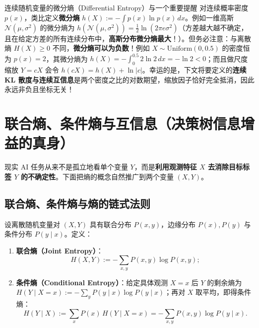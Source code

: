 \begin{extBox}{连续随机变量的微分熵（Differential Entropy）与一个重要提醒}
对连续概率密度 $p(x)$，类比定义\textbf{微分熵} $h(X) := -\int p(x)\ln p(x)\,dx$。例如一维高斯 $\mathcal{N}(\mu, \sigma^2)$ 的微分熵为 $h(\mathcal{N}(\mu,\sigma^2)) = \frac{1}{2}\ln(2\pi e \sigma^2)$（方差越大越不确定，且在给定方差的所有连续分布中，\textbf{高斯分布微分熵最大}！）。但务必注意：与离散熵 $H(X) \ge 0$ 不同，\textbf{微分熵可以为负数}！例如 $X \sim \mathrm{Uniform}(0, 0.5)$ 的密度恒为 $p(x)=2$，其微分熵为 $h(X) = -\int_0^{0.5} 2\ln 2\,dx = -\ln 2 < 0$；而且做尺度缩放 $Y = cX$ 会令 $h(cX) = h(X) + \ln|c|$。幸运的是，下文将要定义的\textbf{连续 KL 散度与连续互信息}是两个密度之比的对数期望，缩放因子恰好完全抵消，因此永远非负且坐标无关！
\end{extBox}

\section{联合熵、条件熵与互信息（决策树信息增益的真身）}
\label{sec:ch4-mi}

现实 AI 任务从来不是孤立地看单个变量 $Y$，而是\textbf{利用观测特征 $X$ 去消除目标标签 $Y$ 的不确定性}。下面把熵的概念自然推广到两个变量 $(X, Y)$。

\subsection{联合熵、条件熵与熵的链式法则}

\begin{defBox}
\begin{definition}[联合熵与条件熵]
\label{def:ch4-joint-cond-entropy}
设离散随机变量对 $(X, Y)$ 具有联合分布 $P(x, y)$，边缘分布 $P(x), P(y)$ 与条件分布 $P(y\mid x)$。定义：
\begin{enumerate}
  \item \textbf{联合熵（Joint Entropy）}：
  \[
    H(X, Y) := -\sum_{x, y} P(x, y)\log P(x, y);
  \]
  \item \textbf{条件熵（Conditional Entropy）}：给定具体观测 $X = x$ 后 $Y$ 的剩余熵为 $H(Y \mid X = x) := -\sum_y P(y\mid x)\log P(y\mid x)$；再对 $X$ 取平均，即得条件熵：
  \begin{equation}
    H(Y \mid X) := \sum_{x} P(x)\, H(Y \mid X = x) = -\sum_{x, y} P(x, y)\log P(y \mid x). \label{eq:ch4-cond-entropy}
  \end{equation}
\end{enumerate}
\end{definition}
\end{defBox}


